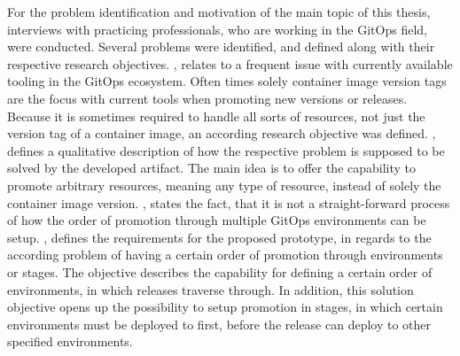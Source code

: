 For the problem identification and motivation of the main topic of this thesis,
interviews with practicing professionals, who are working in the GitOps field, were conducted.
Several problems were identified,
and defined along with their respective research objectives.
\textbf{},
relates to a frequent issue with currently available tooling in the GitOps ecosystem. 
Often times solely container image version tags are the focus with current tools when promoting
new versions or releases.
Because it is sometimes required to handle all sorts of resources, not just the version tag of a container image,
an according research objective was defined.
\textbf{},
defines a qualitative description of how the respective problem is supposed to be solved
by the developed artifact. The main idea is to offer the capability to promote arbitrary resources,
meaning any type of resource, instead of solely the container image version.
\textbf{},
states the fact, that it is not a straight-forward process of how the order of promotion
through multiple GitOps environments can be setup.
\textbf{},
defines the requirements for the proposed prototype,
in regards to the according problem of having a certain order of promotion through environments or stages.
The objective describes the capability for defining a certain order of environments, in which releases traverse through.
In addition, this solution objective opens up the possibility to setup promotion in stages, in which
certain environments must be deployed to first, before the release can deploy to other specified environments.
